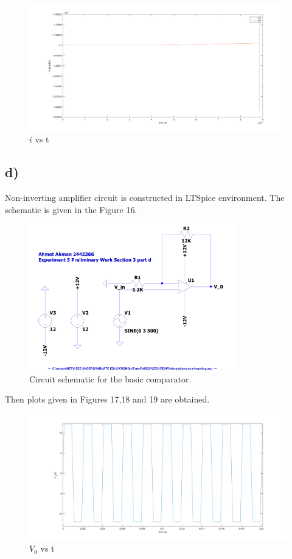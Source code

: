\documentclass[letterpaper,12pt]{article}
\begin{document}
\begin{figure}[H]
	\centering
   \includegraphics[width=1\textwidth]{3c_i.png}
   \caption{\(i\) vs t}
\end{figure}

\subsection{d)}
Non-inverting amplifier circuit is constructed in LTSpice environment. The schematic is given in the Figure 16.
\begin{figure}[H]
	\centering
   \includegraphics[width=0.8\textwidth]{non-inverting_SCH.pdf}
   \caption{Circuit schematic for the basic comparator.}
\end{figure} 
Then plots given in Figures 17,18 and 19 are obtained.
\begin{figure}[H]
	\centering
   \includegraphics[width=1\textwidth]{3d_vs_t.png}
   \caption{\(V_0\) vs t}
\end{figure}
\end{document}
